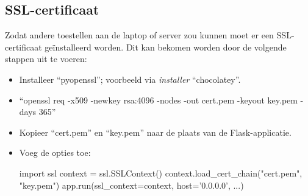 \subsection{SSL-certificaat}
Zodat andere toestellen aan de laptop of server zou kunnen moet er een SSL-certificaat geïnstalleerd worden. Dit kan bekomen worden door de volgende stappen uit te voeren:
\begin{itemize}
	\item Installeer ``pyopenssl''; voorbeeld via \textit{installer} ``chocolatey''.
	\item ``openssl req -x509 -newkey rsa:4096 -nodes -out cert.pem -keyout key.pem -days 365''
	\item Kopieer ``cert.pem'' en ``key.pem'' naar de plaats van de Flask-applicatie.
	\item Voeg de opties toe:
	\begin{python}
		import ssl
  		context = ssl.SSLContext()
		context.load_cert_chain("cert.pem", "key.pem")
		app.run(ssl_context=context, host='0.0.0.0', ...)
	\end{python}
\end{itemize}
